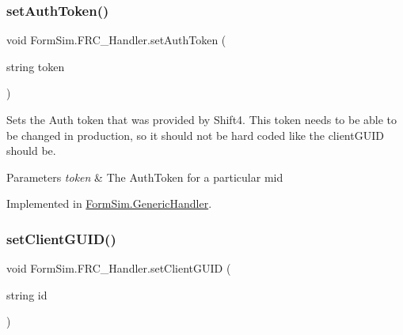 \mbox{\label{interface_form_sim_1_1_f_r_c___handler_a1314ea0937067435e3326818baa9d0c1}} 
\subsubsection{\texorpdfstring{set\+Auth\+Token()}{setAuthToken()}}
{\footnotesize\ttfamily void Form\+Sim.\+F\+R\+C\+\_\+\+Handler.\+set\+Auth\+Token (\begin{DoxyParamCaption}\item[{string}]{token }\end{DoxyParamCaption})}



Sets the Auth token that was provided by Shift4. This token needs to be able to be changed in production, so it should not be hard coded like the client\+G\+U\+ID should be. 


\begin{DoxyParams}{Parameters}
{\em token} & The Auth\+Token for a particular mid\\
\hline
\end{DoxyParams}


Implemented in \mbox{\hyperlink{class_form_sim_1_1_generic_handler_a905d080f02134e993d7afbb1dcc8f44b}{Form\+Sim.\+Generic\+Handler}}.

\mbox{\label{interface_form_sim_1_1_f_r_c___handler_a3c77b2e99c98553928e463a9cbb5f7d4}} 
\subsubsection{\texorpdfstring{set\+Client\+G\+U\+I\+D()}{setClientGUID()}}
{\footnotesize\ttfamily void Form\+Sim.\+F\+R\+C\+\_\+\+Handler.\+set\+Client\+G\+U\+ID (\begin{DoxyParamCaption}\item[{string}]{id }\end{DoxyParamCaption})}




